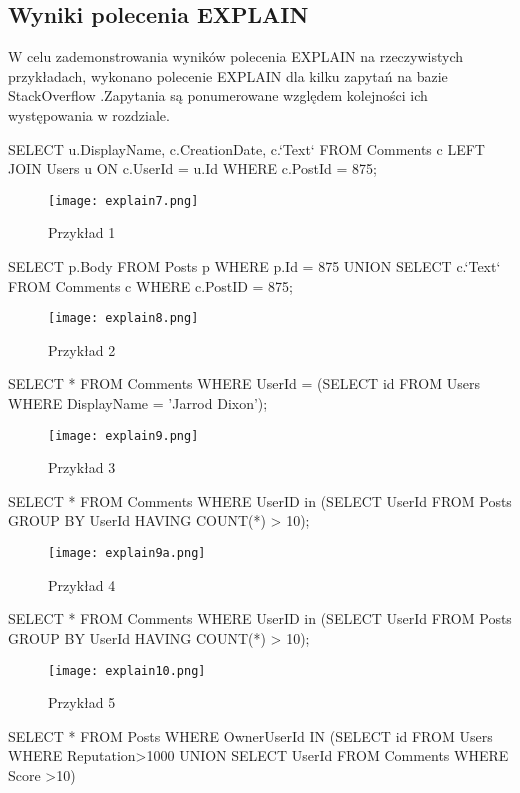 \subsection{Wyniki polecenia EXPLAIN}
W celu zademonstrowania wyników polecenia EXPLAIN na rzeczywistych przykładach, wykonano polecenie EXPLAIN dla kilku zapytań na bazie StackOverflow .Zapytania są ponumerowane względem kolejności ich występowania w rozdziale.
\begin{spverbatim}
	SELECT u.DisplayName, c.CreationDate, c.`Text` FROM  Comments c LEFT JOIN Users u ON c.UserId = u.Id WHERE c.PostId = 875;
\end{spverbatim}
\begin{figure}[H]
	\center
	\texttt{[image: explain7.png]} 
	\caption{Przykład 1}
\end{figure}
\begin{spverbatim}
	SELECT p.Body FROM Posts p WHERE p.Id = 875 UNION
	SELECT c.`Text` FROM Comments c WHERE c.PostID = 875;
\end{spverbatim}
\begin{figure}[H]
	\center
	\texttt{[image: explain8.png]} 
	\caption{Przykład 2}
\end{figure}
\begin{spverbatim}
	SELECT * FROM Comments WHERE UserId = (SELECT id FROM Users WHERE
	DisplayName = 'Jarrod Dixon');
\end{spverbatim}
\begin{figure}[H]
	\center
	\texttt{[image: explain9.png]} 
	\caption{Przykład 3}
\end{figure}
\begin{spverbatim}
	SELECT * FROM Comments WHERE UserID in (SELECT UserId FROM Posts GROUP BY UserId HAVING COUNT(*) > 10);
\end{spverbatim}
\begin{figure}[H]
	\center
	\texttt{[image: explain9a.png]} 
	\caption{Przykład 4}
\end{figure}
\begin{spverbatim}
	SELECT * FROM Comments WHERE UserID in (SELECT UserId FROM Posts GROUP BY UserId HAVING COUNT(*) > 10);
\end{spverbatim}
\begin{figure}[H]
	\center
	\texttt{[image: explain10.png]} 
	\caption{Przykład 5}
\end{figure}
\begin{spverbatim}
	SELECT * FROM Posts  WHERE OwnerUserId IN (SELECT id FROM Users WHERE Reputation>1000 UNION SELECT UserId FROM Comments WHERE Score >10)
\end{spverbatim}
